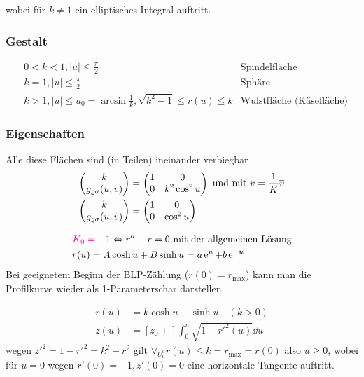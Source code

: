 wobei für \(k \ne 1\) ein elliptisches Integral auftritt.

\subsubsection{Gestalt}
\begin{align*}
 &0 < k < 1, |u| \le \frac{\pi}{2} & \text{Spindelfläche} \\
 &k = 1, |u| \le \frac{\pi}{2} & \text{Sphäre} \\
 &k > 1, |u| \le u_0 = \arcsin \frac{1}{k}, \sqrt{k^2 - 1} \le r(u) \le k & \text{Wulstfläche (Käsefläche)}
\end{align*}

\subsubsection{Eigenschaften}
Alle diese Flächen sind (in Teilen) ineinander verbiegbar
\begin{align*}
 \begin{pmatrix} k \\ g_{\varrho \sigma}(u,v) \end{pmatrix}  &= \begin{pmatrix}
                                     1 & 0 \\
                                     0 & k^2 \cos^2 u
                                    \end{pmatrix}
 \text{ und mit } v = \frac{1}{K} \overline v \\
 \begin{pmatrix} k \\ g_{\varrho \sigma}(u, \overline v) \end{pmatrix}  &= \begin{pmatrix}
                                                 1 & 0 \\
                                                 0 & \cos^2 u
                                                \end{pmatrix}
\end{align*}

\begin{align*}
 &{\color{magenta}K_0 = -1} \Leftrightarrow r'' - r = 0 \text{ mit der allgemeinen Lösung} \\
 &r(u) = A \cosh u + B \sinh u = a \operatorname{e}^u + b \operatorname{e}^{-u}
\end{align*}
Bei geeignetem Beginn der BLP-Zählung (\(r(0) = r_\text{max}\)) kann man die Profilkurve wieder als 1-Parameterschar darstellen.

\begin{align*}
 r(u) &= k \cosh u - \sinh u \quad (k > 0) \\
 z(u) &= [z_0 \pm] \int_0^u \sqrt{1 - r'^2(u)} \dd u
\end{align*}
wegen \(z'^2 = 1-r'^2 \stackrel{!}{=} k^2 - r^2\) gilt \(\forall_{U_0^a}r(u) \le k = r_\text{max} = r(0)\) also \uline{\(u \ge 0\)}, wobei für \(u = 0\) wegen \(r'(0) = -1, z'(0) = 0\) eine horizontale Tangente auftritt.

